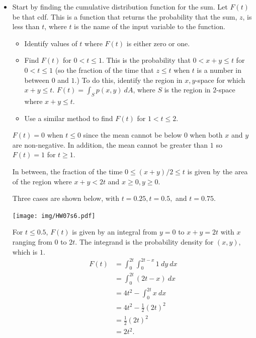 \documentclass[12pt,letterpaper,noanswers]{exam}
\begin{document}
\begin{questions}
\begin{parts}
\end{parts}

\begin{itemize}
\item Start by finding the cumulative distribution function for the sum.  Let $F(t)$ be that cdf.  This is a function that returns the probability that the sum, $z$, is less than $t$, where $t$ is the name of the input variable to the function.  %
\begin{itemize}
\item Identify values of $t$ where $F(t)$ is either zero or one.  
\item Find $F(t)$ for $0<t\leq 1$.  This is the probability that $0< x+y \leq t$ for $0<t\leq 1$ (so the fraction of the time that $z \leq t$ when $t$ is a number in between $0$ and $1$.) To do this, identify the region in $x,y$-space for which $x+y\leq t$.  $F(t) = \int_S p(x,y)\ dA$, where $S$ is the region in $2$-space where $x+y\leq t$.
\item Use a similar method to find $F(t)$ for $1< t \leq 2$.
\end{itemize}

\begin{solution}
$F(t) = 0$ when $t\leq 0$ since the mean cannot be below $0$ when both $x$ and $y$ are non-negative.  In addition, the mean cannot be greater than $1$ so $F(t) = 1$ for $t\geq 1$.

In between, the fraction of the time $0\leq (x+y)/2\leq t$ is given by the area of the region where $x+y<2t$ and $x\geq 0, y\geq 0$.  

Three cases are shown below, with $t = 0.25, t=0.5,$ and $t=0.75$.

\texttt{[image: img/HW07s6.pdf]}

For $t\leq 0.5$, $F(t)$ is given by an integral from $y=0$ to $x+y = 2t$ with $x$ ranging from $0$ to $2t$.  The integrand is the probability density for $(x,y)$, which is $1$.
\begin{align*}
F(t) &= \int_0^{2t}\int_0^{2t-x} 1\ dy\ dx \\
&= \int_0^{2t} (2t-x)\ dx \\
&= 4t^2- \int_0^{2t}x\ dx \\
&= 4t^2- \frac{1}{2}(2t)^2 \\
&= \frac{1}{2}(2t)^2 \\
&= 2t^2.
\end{align*}


\end{solution}
\end{itemize}
\end{questions}
\end{document}
